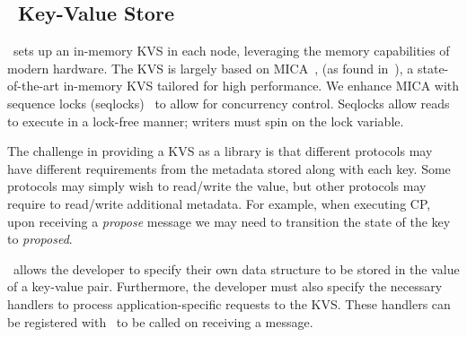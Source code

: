 \subsection{\odlib~Key-Value Store} \label{sec:kvs}

\odlib~sets up an in-memory KVS in each node, 
leveraging the memory capabilities of modern hardware.
The KVS is largely based on MICA~\cite{Lim:2014}, (as found in~\cite{Kalia:2014}), a state-of-the-art in-memory KVS tailored for high performance. We enhance MICA with sequence locks (seqlocks)~\cite{Lameter:2005} 
to allow for concurrency control. Seqlocks allow reads to execute in a lock-free manner; writers must spin on the lock variable.

The challenge in providing a KVS as a library is that different protocols may have different requirements from the metadata stored along with each key. 
Some protocols may simply wish to read/write the value, but other protocols may require to read/write additional metadata. 
For example, when executing CP, upon receiving a \emph{propose} message we may need to transition the state of the key to \emph{proposed}.


\odlib~allows the developer to specify their own data structure to be stored in the value of a key-value pair. 
Furthermore, the developer must also specify 
the necessary handlers to process application-specific requests to the KVS. These handlers can be registered with \odlib~to be called on receiving a message.


